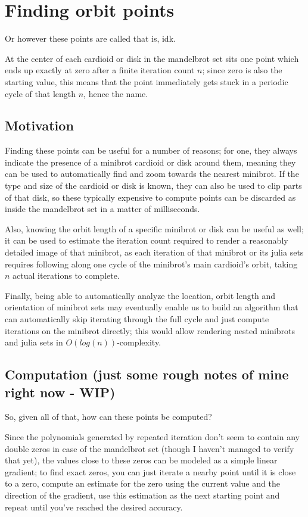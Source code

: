 \documentclass[12pt,a4paper]{article}
\begin{document}
	
\section{Finding orbit points}

Or however these points are called that is, idk.

At the center of each cardioid or disk in the mandelbrot set sits one point which ends up exactly at zero after a finite iteration count $n$; since zero is also the starting value, this means that the point immediately gets stuck in a periodic cycle of that length $n$, hence the name.

\subsection{Motivation}

Finding these points can be useful for a number of reasons; for one, they always indicate the presence of a minibrot cardioid or disk around them, meaning they can be used to automatically find and zoom towards the nearest minibrot. If the type and size of the cardioid or disk is known, they can also be used to clip parts of that disk, so these typically expensive to compute points can be discarded as inside the mandelbrot set in a matter of milliseconds.

Also, knowing the orbit length of a specific minibrot or disk can be useful as well; it can be used to estimate the iteration count required to render a reasonably detailed image of that minibrot, as each iteration of that minibrot or its julia sets requires following along one cycle of the minibrot's main cardioid's orbit, taking $n$ actual iterations to complete.

Finally, being able to automatically analyze the location, orbit length and orientation of minibrot sets may eventually enable us to build an algorithm that can automatically skip iterating through the full cycle and just compute iterations on the minibrot directly; this would allow rendering nested minibrots and julia sets in $O(log(n))$-complexity.

\subsection{Computation (just some rough notes of mine right now - WIP)}

So, given all of that, how can these points be computed?

Since the polynomials generated by repeated iteration don't seem to contain any double zeros in case of the mandelbrot set (though I haven't managed to verify that yet), the values close to these zeros can be modeled as a simple linear gradient; to find exact zeros, you can just iterate a nearby point until it is close to a zero, compute an estimate for the zero using the current value and the direction of the gradient, use this estimation as the next starting point and repeat until you've reached the desired accuracy.
\end{document}
